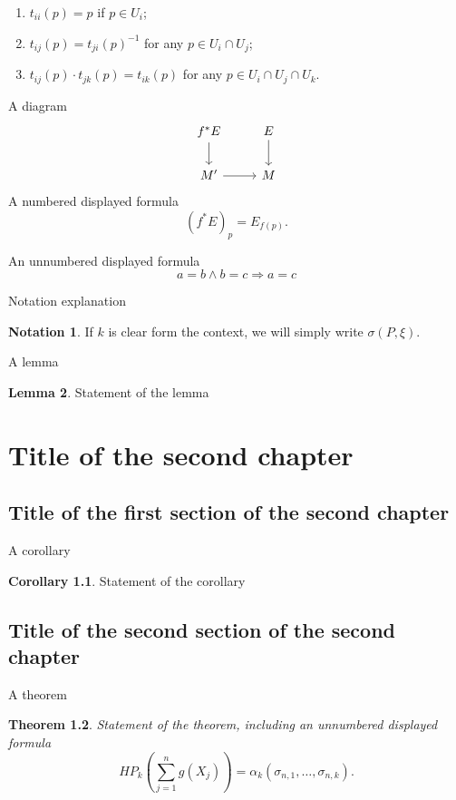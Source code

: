 \documentclass[a4paper,10 pt,titlepage,twoside]{book}
\numberwithin{equation}{chapter}
\theoremstyle{plain}
\newtheorem{thm}{Theorem}[chapter] %
\theoremstyle{definition}
\newtheorem{notn}[thm]{Notation}
\newtheorem{lem}[thm]{Lemma}
\newtheorem{cor}[thm]{Corollary}
\DeclareMathOperator{\1}{\mathbb{1}}
\begin{document}
\begin{enumerate}
    \item $t_{ii}(p)=p$ if $p \in U_i$;
    \item $t_{ij}(p) = t_{ji}(p)^{-1}$ for any $p \in  U_i \cap U_j$;
    \item $t_{ij}(p)\cdot t_{jk}(p) = t_{ik}(p)$ for any $p\in U_i \cap U_j \cap U_k$.
\end{enumerate}
A diagram
\[
\begin{tikzcd}
    f^*E \arrow{d}{} & E \arrow{d}{}\\
    M' \arrow{r}{} & M
\end{tikzcd}
\]
A numbered displayed formula
\begin{equation}
\label{ps:2}
    (f^*E)_p= E_{f(p)}.
\end{equation}

An unnumbered displayed formula
\[
	a=b \wedge b=c \Rightarrow a=c
\]

Notation explanation
\begin{notn}
If $k$ is clear form the context, we will simply write $\sigma(P,\xi)$.
\end{notn}

A lemma

\begin{lem}
\label{corr:15}
Statement of the lemma
\end{lem}

\chapter{Title of the second chapter}
\label{chap:2}
\section{Title of the first section of the second chapter}
\label{sec:21}

A corollary

\begin{cor}
\label{cor:2}
    Statement of the corollary
    
    \end{cor}

    
\section{Title of the second section of the second chapter}
\label{sec:22}

A theorem 
\begin{thm}
    Statement of the theorem, including an unnumbered displayed formula
    \begin{displaymath}
        HP_k\left(\sum_{j=1}^n g(X_j)\right)= \alpha_k(\sigma_{n,1}, \dots, \sigma_{n,k}).
    \end{displaymath}
\end{thm}
\end{document}
